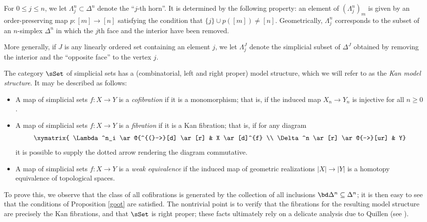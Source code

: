 \begin{example}
For $0 \leq j \leq n$, we let $\Lambda^n_j \subset \Delta^n$
denote the ``$j$-th horn''. It is determined by the following
property: an element of $(\Lambda^n_j)_m$ is given by an
order-preserving map $p: [m] \rightarrow [n]$ satisfying the condition that 
$\{j \} \cup p( [m] ) \neq [n]$. Geometrically,
$\Lambda^n_j$ corresponds to the subset of an $n$-simplex
$\Delta^n$ in which the $j$th face and the interior have been
removed.

More generally, if $J$ is any linearly ordered set containing an element $j$, we let
$\Lambda^J_j$ denote the simplicial subset of $\Delta^J$ obtained by removing the interior
and the ``opposite face'' to the vertex $j$.
\end{example}

The category $\sSet$ of simplicial sets has a (combinatorial, left and right proper) model structure, which we will refer to as the {\it Kan model structure}. It may be described as follows:

\begin{itemize}
\item A map of simplicial sets $f: X \rightarrow Y$ is a {\it cofibration} if it is a monomorphism; that is, if the induced map $X_n \rightarrow Y_n$ is injective for all $n \geq 0$.
\item A map of simplicial sets $f: X \rightarrow Y$ is a {\it fibration} if it is a Kan fibration; that is, if for any diagram
$$ \xymatrix{ \Lambda^n_i \ar@{^{(}->}[d] \ar[r] & X \ar[d]^{f} \\
\Delta^n \ar[r] \ar@{-->}[ur] & Y}$$
it is possible to supply the dotted arrow rendering the diagram commutative.
\item A map of simplicial sets $f: X \rightarrow Y$ is a {\it weak equivalence} if the induced map of geometric realizations $|X| \rightarrow |Y|$ is a homotopy equivalence of topological spaces.
\end{itemize}

To prove this, we observe that the class of all cofibrations is generated by the collection of all inclusions $\bd \Delta^n \subseteq \Delta^n$; it is then easy to see that the conditions of
Proposition \ref{goot} are satisfied. The nontrivial point
is to verify that the fibrations for the resulting model structure are precisely the Kan fibrations, and
that $\sSet$ is right proper; these facts ultimately rely on a delicate analysis due to Quillen (see \cite{goerssjardine}).

